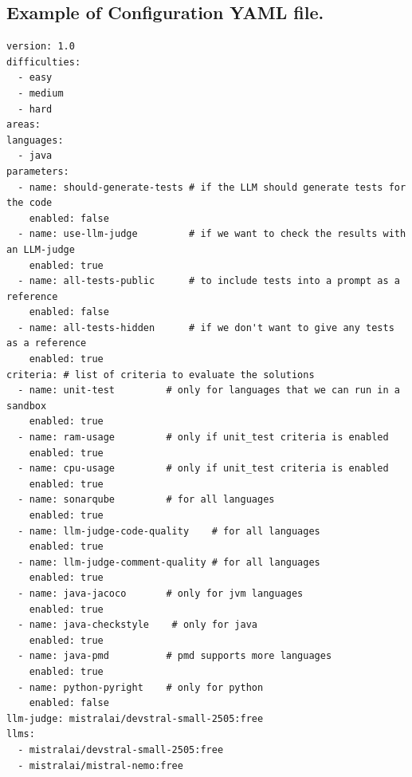 \subsection*{Example of Configuration YAML file.}
\label{appendix:exec-config-example}
\begin{verbatim}
version: 1.0
difficulties:
  - easy
  - medium
  - hard
areas:
languages:
  - java
parameters:
  - name: should-generate-tests # if the LLM should generate tests for the code
    enabled: false
  - name: use-llm-judge         # if we want to check the results with an LLM-judge
    enabled: true
  - name: all-tests-public      # to include tests into a prompt as a reference
    enabled: false
  - name: all-tests-hidden      # if we don't want to give any tests as a reference
    enabled: true
criteria: # list of criteria to evaluate the solutions
  - name: unit-test         # only for languages that we can run in a sandbox
    enabled: true
  - name: ram-usage         # only if unit_test criteria is enabled
    enabled: true
  - name: cpu-usage         # only if unit_test criteria is enabled
    enabled: true
  - name: sonarqube         # for all languages
    enabled: true
  - name: llm-judge-code-quality    # for all languages
    enabled: true
  - name: llm-judge-comment-quality # for all languages
    enabled: true
  - name: java-jacoco       # only for jvm languages
    enabled: true
  - name: java-checkstyle    # only for java
    enabled: true
  - name: java-pmd          # pmd supports more languages
    enabled: true
  - name: python-pyright    # only for python
    enabled: false
llm-judge: mistralai/devstral-small-2505:free
llms:
  - mistralai/devstral-small-2505:free
  - mistralai/mistral-nemo:free

\end{verbatim}





